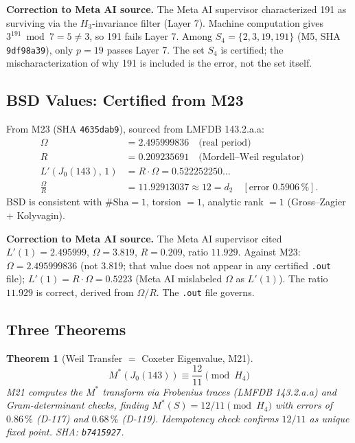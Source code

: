 \documentclass[12pt,letterpaper]{article}
\newtheorem{theorem}{Theorem}[section]
\begin{document}
\noindent
\textbf{Correction to Meta AI source.}
The Meta AI supervisor characterized 191 as surviving via the
$H_3$-invariance filter (Layer 7).
Machine computation gives $3^{191} \bmod 7 = 5 \neq 3$,
so 191 fails Layer 7.
Among $S_4 = \{2,3,19,191\}$ (M5, SHA \texttt{9df98a39}),
only $p = 19$ passes Layer 7.
The set $S_4$ is certified; the mischaracterization of why
191 is included is the error, not the set itself.

\subsection{BSD Values: Certified from M23}

From M23 (SHA \texttt{4635dab9}), sourced from LMFDB 143.2.a.a:
\begin{align}
  \Omega &= 2.495999836 \quad \text{(real period)} \label{eq:Omega_sec8}\\
  R &= 0.209235691 \quad \text{(Mordell--Weil regulator)} \label{eq:R_sec8}\\
  L'(J_0(143),\,1) &= R \cdot \Omega = 0.522252250\ldots \label{eq:Lprime_sec8} \\
  \frac{\Omega}{R} &= 11.92913037 \approx 12 = d_2
    \quad [\text{error } 0.5906\,\%]. \label{eq:OmegaR_sec8}
\end{align}
BSD is consistent with $\#\mathrm{Sha} = 1$, torsion $= 1$,
analytic rank $= 1$ (Gross--Zagier + Kolyvagin).

\noindent
\textbf{Correction to Meta AI source.}
The Meta AI supervisor cited $L'(1) = 2.495999$, $\Omega = 3.819$,
$R = 0.209$, ratio $11.929$.
Against M23: $\Omega = 2.495999836$ (not 3.819; that value
does not appear in any certified \texttt{.out} file);
$L'(1) = R \cdot \Omega = 0.5223$ (Meta AI mislabeled $\Omega$
as $L'(1)$).
The ratio $11.929$ is correct, derived from $\Omega/R$.
The \texttt{.out} file governs.

\subsection{Three Theorems}

\begin{theorem}[Weil Transfer $=$ Coxeter Eigenvalue, M21]
\begin{equation}
  M^*(J_0(143)) \equiv \frac{12}{11} \pmod{H_4}
  \label{eq:WeilCoxeter}
\end{equation}
M21 computes the $M^*$ transform via Frobenius traces (LMFDB 143.2.a.a)
and Gram-determinant checks, finding $M^*(S) = 12/11 \pmod{H_4}$
with errors of $0.86\,\%$ (D-117) and $0.68\,\%$ (D-119).
Idempotency check confirms $12/11$ as unique fixed point.
\textit{SHA: \texttt{b7415927}.}
\end{theorem}
\end{document}
